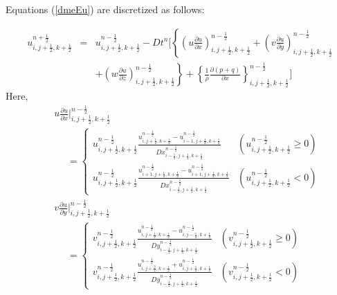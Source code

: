 \begin{enumerate}
Equations (\ref{dmeEu}) are discretized as follows: 

\begin{eqnarray}
u^{n+\frac{1}{2}}_{i,j+\frac{1}{2},k+\frac{1}{2}} &=& u^{n-\frac{1}{2}}_{i,j+\frac{1}{2},k+\frac{1}{2}} - Dt^n \Biggl[ \left\{ \left(u \frac{\partial u}{\partial x} \right)^{n-\frac{1}{2}}_{i,j+\frac{1}{2},k+\frac{1}{2}} + \left(v \frac{\partial u}{\partial y} \right)^{n-\frac{1}{2}}_{i,j+\frac{1}{2},k+\frac{1}{2}} \right. \\  \nonumber
&& \left.  + \left(w \frac{\partial u}{\partial z} \right)^{n-\frac{1}{2}}_{i,j+\frac{1}{2},k+\frac{1}{2}} \right\} + \left\{ \frac{1}{\rho} \frac{\partial (p+q)}{\partial x} \right\}^{n-\frac{1}{2}}_{i,j+\frac{1}{2},k+\frac{1}{2}} \Biggr] 
\end{eqnarray}
Here, 
\begin{eqnarray*}
&& u \frac{\partial u}{\partial x} \bigg|^{n-\frac{1}{2}}_{i,j+\frac{1}{2},k+\frac{1}{2}} \\
&& \ \ \ \ \ \  = \left\{ 
\begin{array}{ll}
u^{n-\frac{1}{2}}_{i,j+\frac{1}{2},k+\frac{1}{2}} \frac{u^{n-\frac{1}{2}}_{i,j+\frac{1}{2},k+\frac{1}{2}} - u^{n-\frac{1}{2}}_{i-1,j+\frac{1}{2},k+\frac{1}{2}}}{Dx^{n-\frac{1}{2}}_{i-\frac{1}{2},j+\frac{1}{2},k+\frac{1}{2}}} &\left( u^{n-\frac{1}{2}}_{i,j+\frac{1}{2},k+\frac{1}{2}} \geq 0 \right) \\
	u^{n-\frac{1}{2}}_{i,j+\frac{1}{2},k+\frac{1}{2}} \frac{u^{n-\frac{1}{2}}_{i+1,j+\frac{1}{2},k+\frac{1}{2}} - u^{n-\frac{1}{2}}_{i+1,j+\frac{1}{2},k+\frac{1}{2}}}{Dx^{n-\frac{1}{2}}_{i-\frac{1}{2},j+\frac{1}{2},k+\frac{1}{2}}} &\left( u^{n-\frac{1}{2}}_{i,j+\frac{1}{2},k+\frac{1}{2}} <0 \right)
\end{array} 
\right. \\
&& v \frac{\partial u}{\partial y} \bigg|^{n-\frac{1}{2}}_{i,j+\frac{1}{2},k+\frac{1}{2}} \\
&& \ \ \ \ \ \  = \left\{ 
\begin{array}{ll}
	v^{n-\frac{1}{2}}_{i,j+\frac{1}{2},k+\frac{1}{2}} \frac{u^{n-\frac{1}{2}}_{i,j+\frac{1}{2},k+\frac{1}{2}} - u^{n-\frac{1}{2}}_{i,j-\frac{1}{2},k+\frac{1}{2}}}{Dy^{n-\frac{1}{2}}_{i-\frac{1}{2},j+\frac{1}{2},k+\frac{1}{2}}} &\left( v^{n-\frac{1}{2}}_{i,j+\frac{1}{2},k+\frac{1}{2}} \geq 0 \right) \\
	v^{n-\frac{1}{2}}_{i,j+\frac{1}{2},k+\frac{1}{2}} \frac{u^{n-\frac{1}{2}}_{i,j+\frac{3}{2},k+\frac{1}{2}} + u^{n-\frac{1}{2}}_{i,j+\frac{1}{2},k+\frac{1}{2}}}{Dy^{n-\frac{1}{2}}_{i-\frac{1}{2},j+\frac{1}{2},k+\frac{1}{2}}} &\left( v^{n-\frac{1}{2}}_{i,j+\frac{1}{2},k+\frac{1}{2}} < 0 \right) 

\end{array}
\end{eqnarray*}
\end{enumerate}
